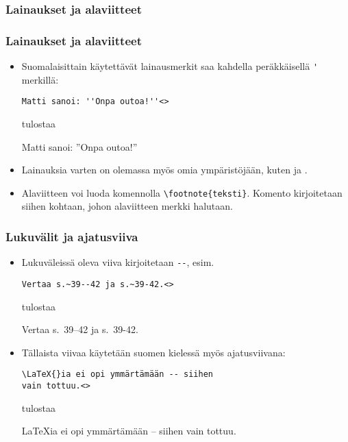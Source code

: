 \subsubsection{Lainaukset ja alaviitteet}
\begin{fframe}
    \frametitle{Lainaukset ja alaviitteet}
    \begin{itemize}[<+->]
        \item Suomalaisittain käytettävät lainausmerkit saa kahdella peräkkäisellä \lstinline-'- merkillä:
            \begin{lstlisting}
Matti sanoi: ''Onpa outoa!''<>
            \end{lstlisting}
            tulostaa
            \begin{sample}
                Matti sanoi: ''Onpa outoa!''
            \end{sample}
        \item Lainauksia varten on olemassa myös omia ympäristöjään, kuten  ja .
        \item Alaviitteen voi luoda komennolla \lstinline-\footnote{teksti}-. Komento kirjoitetaan siihen kohtaan, johon alaviitteen merkki halutaan. 
    \end{itemize}
\end{fframe}

\begin{fframe}
    \frametitle{Lukuvälit ja ajatusviiva}
    \begin{itemize}[<+->]
        \item Lukuväleissä oleva viiva kirjoitetaan \lstinline|--|, esim.
            \begin{lstlisting}
Vertaa s.~39--42 ja s.~39-42.<>
            \end{lstlisting}
            tulostaa
            \begin{sample}
                Vertaa s.~39--42 ja s.~39-42.
            \end{sample}
        \item Tällaista viivaa käytetään suomen kielessä myös ajatusviivana:
            \begin{lstlisting}
\LaTeX{}ia ei opi ymmärtämään -- siihen
vain tottuu.<>
            \end{lstlisting}
            tulostaa
            \begin{sample}
                \LaTeX{}ia ei opi ymmärtämään -- siihen
                vain tottuu.
            \end{sample}
    \end{itemize}
\end{fframe}

